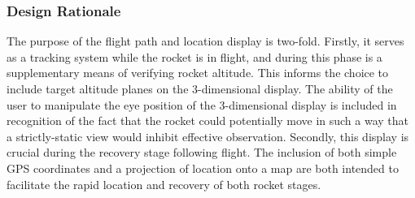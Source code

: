 \documentclass[journal,10pt,onecolumn,compsoc]{IEEEtran}
\begin{document}
		\subsubsection{Design Rationale}
			The purpose of the flight path and location display is two-fold.
			Firstly, it serves as a tracking system while the rocket is in flight, and during this phase is a supplementary means of verifying rocket altitude.
			This informs the choice to include target altitude planes on the 3-dimensional display.
			The ability of the user to manipulate the eye position of the 3-dimensional display is included in recognition of the fact that the rocket could potentially move in such a way that a strictly-static view would inhibit effective observation.
			Secondly, this display is crucial during the recovery stage following flight.
			The inclusion of both simple GPS coordinates and a projection of location onto a map are both intended to facilitate the rapid location and recovery of both rocket stages.

	
\end{document}
